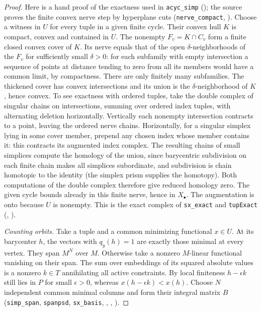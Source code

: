 \begin{proof}
Here is a hand proof of the exactness used in \nolinkurl{acyc_simp}
(); the source proves
the finite convex nerve step by hyperplane cuts
(\nolinkurl{nerve_compact}, ).
Choose a witness in $U$ for every tuple in a given finite cycle.
Their convex hull $K$ is compact, convex and contained in $U$.
The nonempty $F_v=K\cap C_v$ form a finite closed convex cover of $K$.
Its nerve equals that of the open $\delta$-neighborhoods of the $F_v$
for sufficiently small $\delta>0$: for each subfamily with empty
intersection a sequence of points at distance tending to zero from
all its members would have a common limit, by compactness. There are
only finitely many subfamilies. The thickened cover has convex
intersections and its union is the $\delta$-neighborhood of $K$, hence
convex. To see exactness with ordered tuples, take the double complex of
singular chains on intersections, summing over ordered index tuples,
with alternating deletion horizontally. Vertically each nonempty
intersection contracts to a point, leaving the ordered nerve chains.
Horizontally, for a singular simplex lying in some cover member, prepend
any chosen index whose member contains it: this contracts its augmented
index complex. The resulting chains of small simplices compute the
homology of the union, since barycentric subdivision on each finite
chain makes all simplices subordinate, and subdivision is chain
homotopic to the identity (the simplex prism supplies the homotopy).
Both computations of the double complex therefore give reduced
homology zero. The given cycle bounds already in this finite nerve,
hence in $X_\bullet$. The augmentation is onto because $U$ is nonempty.
This is the exact complex of \nolinkurl{sx_exact} and \nolinkurl{tupExact}
(,
).

\emph{Counting orbits.}
Take a tuple and a common minimizing functional $x\in U$.
At its barycenter $h$, the vectors with $q_y(h)=1$ are exactly those
minimal at every vertex. They span $M^N$ over $M$. Otherwise take a
nonzero $M$-linear functional vanishing on their span. The sum over
embeddings of its squared absolute values is a nonzero $k\in T$
annihilating all active constraints. By local finiteness $h-\epsilon k$
still lies in $P$ for small $\epsilon>0$, whereas $x(h-\epsilon k)<x(h)$.
Choose $N$ independent common minimal columns and form their integral
matrix $B$ (\nolinkurl{simp_span}, \nolinkurl{spanpsd}, \nolinkurl{sx_basis},
,
, ).


\end{proof}
